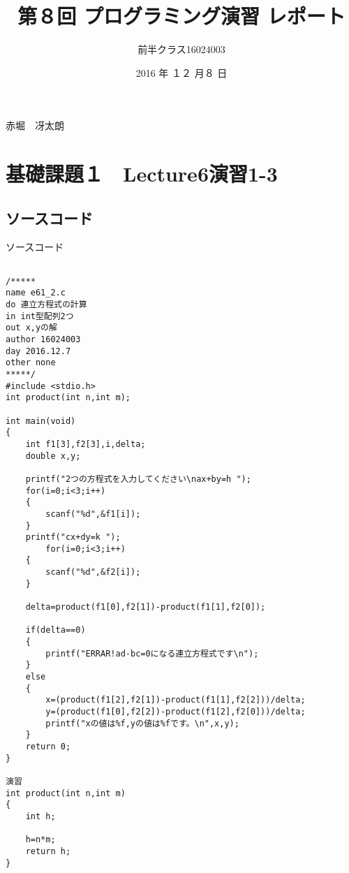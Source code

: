 \documentclass[a4j,titlepage]{jarticle}
\begin{document}

\title{第８回 プログラミング演習 レポート}

\author{前半クラス16024003}{赤堀　冴太朗}

\date{2016 年 １２ 月８ 日}
\maketitle


\section{基礎課題１　Lecture6演習1-3}
\subsection{ソースコード}
\begin{breakitembox}[l]{ソースコード}
\begin{verbatim}

/*****
name e61_2.c
do 連立方程式の計算
in int型配列2つ
out x,yの解
author 16024003
day 2016.12.7
other none
*****/
#include <stdio.h>
int product(int n,int m);

int main(void)
{
    int f1[3],f2[3],i,delta;
    double x,y;

    printf("2つの方程式を入力してください\nax+by=h ");
    for(i=0;i<3;i++)
    {
        scanf("%d",&f1[i]);
    }
    printf("cx+dy=k ");
        for(i=0;i<3;i++)
    {
        scanf("%d",&f2[i]);
    }

    delta=product(f1[0],f2[1])-product(f1[1],f2[0]);

    if(delta==0)
    {
        printf("ERRAR!ad-bc=0になる連立方程式です\n");
    }
    else 
    {
        x=(product(f1[2],f2[1])-product(f1[1],f2[2]))/delta;
        y=(product(f1[0],f2[2])-product(f1[2],f2[0]))/delta;
        printf("xの値は%f,yの値は%fです。\n",x,y);
    }
    return 0;
}

演習
int product(int n,int m)
{
    int h;

    h=n*m;
    return h;
}
\end{verbatim}
\end{breakitembox}
\end{document}

